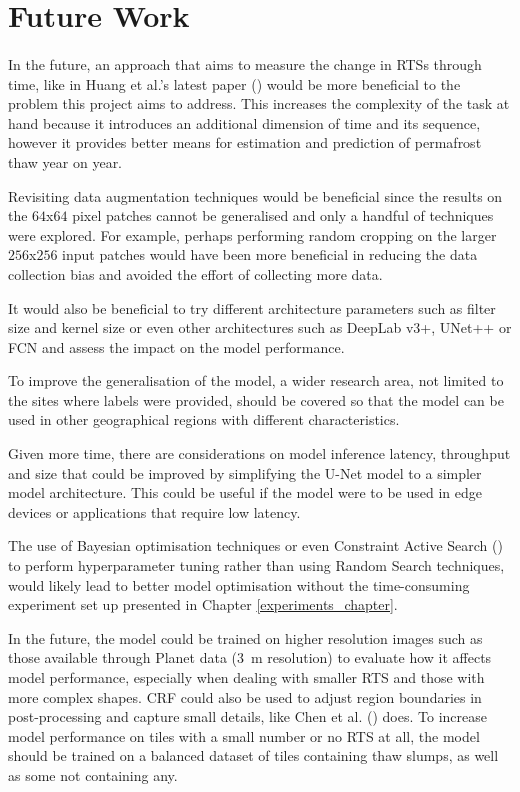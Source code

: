 \section{Future Work}
\paragraph{}
In the future, an approach that aims to measure the change in \gls{RTS}s through time, like in Huang et al.'s latest paper (\cite{HUANG2021102399}) would be more beneficial to the problem this project aims to address. This increases the complexity of the task at hand because it introduces an additional dimension of time and its sequence, however it provides better means for estimation and prediction of permafrost thaw year on year.

Revisiting data augmentation techniques would be beneficial since the results on the $64$x$64$ pixel patches cannot be generalised and only a handful of techniques were explored. For example, perhaps performing random cropping on the larger $256$x$256$ input patches would have been more beneficial in reducing the data collection bias and avoided the effort of collecting more data.

It would also be beneficial to try different architecture parameters such as filter size and kernel size or even other architectures such as DeepLab v3+, UNet++ or \gls{FCN} and assess the impact on the model performance.

To improve the generalisation of the model, a wider research area, not limited to the sites where labels were provided, should be covered so that the model can be used in other geographical regions with different characteristics.

Given more time, there are considerations on model inference latency, throughput and size that could be improved by simplifying the U-Net model to a simpler model architecture. This could be useful if the model were to be used in edge devices or applications that require low latency.

The use of Bayesian optimisation techniques or even Constraint Active Search (\cite{pmlr-v139-malkomes21a}) to perform hyperparameter tuning rather than using Random Search techniques, would likely lead to better model optimisation without the time-consuming experiment set up presented in Chapter \ref{experiments_chapter}.

In the future, the model could be trained on higher resolution images such as those available through Planet data (\SI{3}{\metre} resolution) to evaluate how it affects model performance, especially when dealing with smaller \gls{RTS} and those with more complex shapes.
\gls{CRF} could also be used to adjust region boundaries in post-processing and capture small details, like Chen et al. (\cite{chen2017deeplab}) does.
To increase model performance on tiles with a small number or no \gls{RTS} at all, the model should be trained on a balanced dataset of tiles containing thaw slumps, as well as some not containing any.
